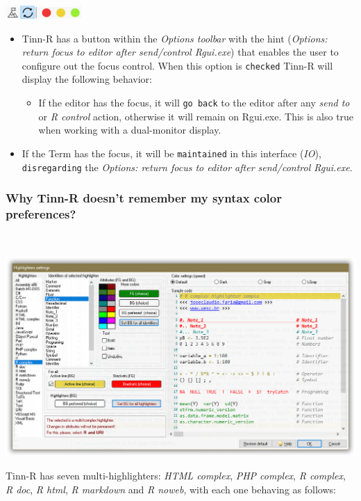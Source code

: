 \includegraphics[scale=1]{./res/focus.png}
\begin{itemize}
  \item Tinn-R has a button within the \textit{Options toolbar}
    with the hint (\textit{Options: return focus to editor
      after send/control Rgui.exe}) that enables the user to
    configure out the focus control. When this option is
    \texttt{checked} Tinn-R will display the following behavior:
    \begin{itemize}
      \item If the editor has the focus, it will \texttt{go back}
        to the editor after any \textit{send to} or \textit{R control}
        action, otherwise it will remain on Rgui.exe. This is also
        true when working with a dual-monitor display.
    \end{itemize}
  \item If the Term has the focus, it will be \texttt{maintained}
    in this interface (\textit{IO}), \texttt{disregarding} the
    \textit{Options: return focus to editor after send/control
      Rgui.exe}.
\end{itemize}


\subsubsection{Why Tinn-R doesn't remember my syntax color preferences?}\\

\includegraphics[width=\headwidth]{./res/dlg_highlighter_settings.png}

Tinn-R has seven multi-highlighters: \textit{HTML complex}, \textit{PHP complex},
\textit{R complex}, \textit{R doc},  \textit{R html}, \textit{R markdown} and \textit{R noweb},
with each one behaving as follows:

